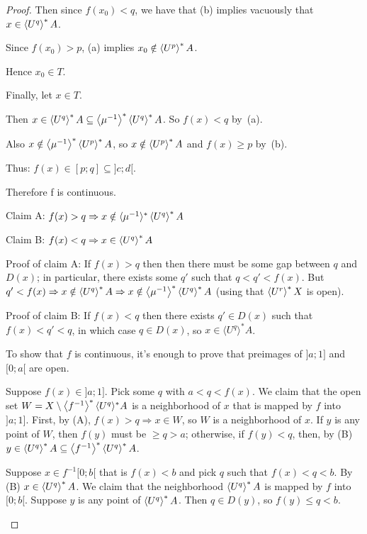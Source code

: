 \begin{proof}
Then since $f(x_0)<q$, we have that (b) implies vacuously that $x\in\left\langle U^q\right\rangle ^{\ast}A$.

Since $f(x_0)>p$, (a) implies $x_0\notin\left\langle U^p\right\rangle ^{\ast}A$.

Hence $x_0\in T$.

Finally, let $x\in T$.

Then $x\in\left\langle U^q\right\rangle ^{\ast}A\subseteq\left\langle \mu^{-1}\right\rangle ^{\ast}\left\langle U^q\right\rangle ^{\ast}A$. So $f(x)<q$ by~(a).

Also $x\notin\left\langle \mu^{-1}\right\rangle ^{\ast}\left\langle U^p\right\rangle ^{\ast}A$, so $x\notin\left\langle U^p\right\rangle ^{\ast}A$ and $f(x)\geq p$ by~(b).

Thus: $f(x)\in[p;q]\subseteq]c;d[$.

Therefore f is continuous.

\begin{grayed}
Claim A: $f (x) > q \Rightarrow x \notin \langle \mu^{- 1}
\rangle^{\ast} \left\langle U^q\right\rangle ^{\ast} A$

Claim B: $f (x) < q \Rightarrow x \in \left\langle U^q\right\rangle ^{\ast} A$

Proof of claim A: If $f (x) > q$ then then there must be some gap between $q$
and $D (x)$; in particular, there exists some $q'$ such that $q < q' < f (x)$.
But $q' < f (x) \Rightarrow x \notin \left\langle U^q\right\rangle ^{\ast} A \Rightarrow x
\notin \left\langle \mu^{- 1}\right\rangle ^{\ast} \left\langle U^q\right\rangle ^{\ast} A$ (using that $\left\langle U^r\right\rangle ^{\ast}X$ is open).

Proof of claim B: If $f (x) < q$ then there exists $q' \in D (x)$ such that $f
(x) < q' < q$, in which case $q \in D (x)$, so $x \in \langle U^q
\rangle^{\ast} A$.

To show that $f$ is continuous, it's enough to prove that preimages of $] a ;
1]$ and $[0 ; a [$ are open.


Suppose $f (x) \in] a ; 1]$. Pick some $q$ with $a < q < f (x)$. We claim that
the open set $W = X \setminus \left\langle f^{- 1}\right\rangle ^{\ast} \langle U^q
\rangle^{\ast} A$ is a neighborhood of $x$ that is mapped by $f$ into $] a ;
1]$. First, by (A), $f (x) > q \Rightarrow x \in W$, so $W$ is a neighborhood
of $x$. If $y$ is any point of $W$, then $f (y)$ must be $\geq q > a$;
otherwise, if $f (y) < q$, then, by (B) $y \in \left\langle U^q\right\rangle ^{\ast} A
\subseteq \left\langle f^{- 1}\right\rangle ^{\ast} \left\langle U^q\right\rangle ^{\ast} A$.

Suppose $x \in f^{- 1} [0 ; b [$ that is $f (x) < b$ and pick $q$ such that $f
(x) < q < b$. By (B) $x \in \left\langle U^q\right\rangle ^{\ast} A$. We claim that the
neighborhood $\left\langle U^q\right\rangle ^{\ast} A$ is mapped by $f$ into $[0 ; b [$.
Suppose $y$ is any point of $\left\langle U^q\right\rangle ^{\ast} A$. Then $q \in D
(y)$, so $f (y) \leq q < b$.

\end{grayed}
\end{proof}